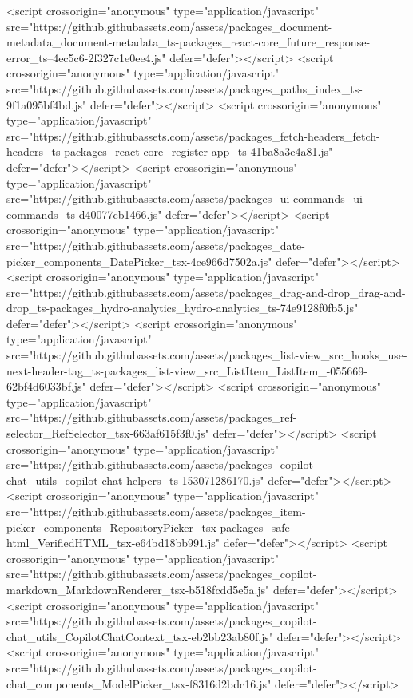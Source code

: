 <script crossorigin="anonymous" type="application/javascript" src="https://github.githubassets.com/assets/packages_document-metadata_document-metadata_ts-packages_react-core_future_response-error_ts--4ec5c6-2f327c1e0ee4.js" defer="defer"></script>
<script crossorigin="anonymous" type="application/javascript" src="https://github.githubassets.com/assets/packages_paths_index_ts-9f1a095bf4bd.js" defer="defer"></script>
<script crossorigin="anonymous" type="application/javascript" src="https://github.githubassets.com/assets/packages_fetch-headers_fetch-headers_ts-packages_react-core_register-app_ts-41ba8a3e4a81.js" defer="defer"></script>
<script crossorigin="anonymous" type="application/javascript" src="https://github.githubassets.com/assets/packages_ui-commands_ui-commands_ts-d40077cb1466.js" defer="defer"></script>
<script crossorigin="anonymous" type="application/javascript" src="https://github.githubassets.com/assets/packages_date-picker_components_DatePicker_tsx-4ce966d7502a.js" defer="defer"></script>
<script crossorigin="anonymous" type="application/javascript" src="https://github.githubassets.com/assets/packages_drag-and-drop_drag-and-drop_ts-packages_hydro-analytics_hydro-analytics_ts-74e9128f0fb5.js" defer="defer"></script>
<script crossorigin="anonymous" type="application/javascript" src="https://github.githubassets.com/assets/packages_list-view_src_hooks_use-next-header-tag_ts-packages_list-view_src_ListItem_ListItem_-055669-62bf4d6033bf.js" defer="defer"></script>
<script crossorigin="anonymous" type="application/javascript" src="https://github.githubassets.com/assets/packages_ref-selector_RefSelector_tsx-663af615f3f0.js" defer="defer"></script>
<script crossorigin="anonymous" type="application/javascript" src="https://github.githubassets.com/assets/packages_copilot-chat_utils_copilot-chat-helpers_ts-153071286170.js" defer="defer"></script>
<script crossorigin="anonymous" type="application/javascript" src="https://github.githubassets.com/assets/packages_item-picker_components_RepositoryPicker_tsx-packages_safe-html_VerifiedHTML_tsx-e64bd18bb991.js" defer="defer"></script>
<script crossorigin="anonymous" type="application/javascript" src="https://github.githubassets.com/assets/packages_copilot-markdown_MarkdownRenderer_tsx-b518fcdd5e5a.js" defer="defer"></script>
<script crossorigin="anonymous" type="application/javascript" src="https://github.githubassets.com/assets/packages_copilot-chat_utils_CopilotChatContext_tsx-eb2bb23ab80f.js" defer="defer"></script>
<script crossorigin="anonymous" type="application/javascript" src="https://github.githubassets.com/assets/packages_copilot-chat_components_ModelPicker_tsx-f8316d2bdc16.js" defer="defer"></script>
